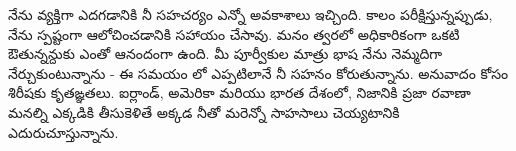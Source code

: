 \documentclass[12pt,varwidth]{standalone}
\begin{document}



నేను వ్యక్తిగా ఎదగడానికి నీ సహచర్యం ఎన్నో అవకాశాలు ఇచ్చింది. కాలం పరీక్షిస్తున్నప్పుడు, నేను స్పష్టంగా ఆలోచించడానికి సహాయం చేసావు. మనం త్వరలో అధికారికంగా ఒకటి ఔతున్నన్దుకు ఎంతో ఆనందంగా ఉంది. మీ పూర్వీకుల మాత్రు భాష నేను నెమ్మదిగా నేర్చుకుంటున్నాను - ఈ సమయం లో ఎప్పటిలానే నీ సహనం కోరుతున్నాను. అనువాదం కోసం శిరీషకు కృతఙ్ఞతలు. ఐర్లాండ్, అమెరికా మరియు భారత దేశంలో, నిజానికి ప్రజా రవాణా మనల్ని ఎక్కడికి తీసుకెళితే అక్కడ నీతో మరెన్నో సాహసాలు చెయ్యటానికి ఎదురుచూస్తున్నాను.

\end{document}
